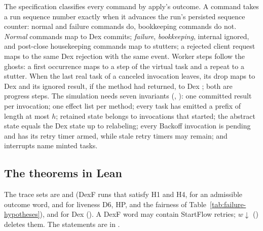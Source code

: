 The specification classifies every command by apply's outcome. A command
takes a run sequence number exactly when it advances the run's persisted
sequence counter: normal and failure commands do, bookkeeping commands do
not. \emph{Normal} commands map to Dex commits;
\emph{failure}, \emph{bookkeeping}, internal ignored, and post-close
housekeeping commands map to stutters; a rejected client request maps to
the same Dex rejection with the same event. Worker steps follow the ghosts:
a first occurrence maps to a step of the virtual task and a repeat to a
stutter. When the last real task of a canceled invocation leaves, its drop
maps to Dex  and its ignored result, if the
method had returned, to Dex ; both are
progress steps. The simulation needs seven invariants (,
): one committed result per invocation; one
effect list per method; every task has emitted a prefix of length at most
$h$; retained state belongs to invocations that started; the abstract
state equals the Dex state up to relabeling; every Backoff invocation is
pending and has its retry timer armed, while stale retry timers may
remain; and interrupts name minted tasks.

\subsection{The theorems in Lean}
\label{sec:failure-theorems}

The trace sets are  and
 (DexF runs that satisfy H1 and H4, for an
admissible outcome word, and for liveness D6, HP, and the fairness of
Table~\ref{tab:failure-hypotheses}), and  for Dex
(). A DexF word may contain StartFlow
retries; $w{\downarrow}$ () deletes them. The statements
are in .

